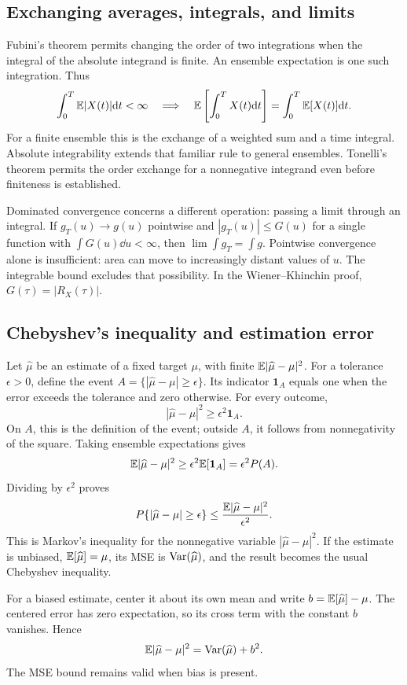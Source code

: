 \subsection{Exchanging averages, integrals, and limits}
\label{app:integration}
Fubini's theorem permits changing the order of two integrations when the integral of the absolute integrand is finite. An ensemble expectation is one such integration. Thus
\[
\int_0^T\mathbb E|X(t)|\mathrm d t<\infty
\quad\Longrightarrow\quad
\mathbb E\left[\int_0^T X(t)\mathrm d t\right]
=\int_0^T\mathbb E[X(t)]\mathrm d t.
\]
For a finite ensemble this is the exchange of a weighted sum and a time integral. Absolute integrability extends that familiar rule to general ensembles. Tonelli's theorem permits the order exchange for a nonnegative integrand even before finiteness is established.

Dominated convergence concerns a different operation: passing a limit through an integral. If $g_T(u)\to g(u)$ pointwise and $|g_T(u)|\leq G(u)$ for a single function with $\int G(u)\dd u<\infty$, then $\lim\int g_T=\int g$. Pointwise convergence alone is insufficient: area can move to increasingly distant values of $u$. The integrable bound excludes that possibility. In the Wiener--Khinchin proof, $G(\tau)=|R_X(\tau)|$.

\subsection{Chebyshev's inequality and estimation error}
\label{app:chebyshev}
Let $\widehat\mu$ be an estimate of a fixed target $\mu$, with finite $\mathbb E|\widehat\mu-\mu|^2$. For a tolerance $\epsilon>0$, define the event
$A=\{|\widehat\mu-\mu|\geq\epsilon\}$. Its indicator $\mathbf1_A$ equals one when the error exceeds the tolerance and zero otherwise. For every outcome,
\[
|\widehat\mu-\mu|^2\geq\epsilon^2\mathbf1_A.
\]
On $A$, this is the definition of the event; outside $A$, it follows from nonnegativity of the square. Taking ensemble expectations gives
\[
\mathbb E|\widehat\mu-\mu|^2\geq\epsilon^2\mathbb E[\mathbf1_A]
=\epsilon^2P(A).
\]
Dividing by $\epsilon^2$ proves
\[
P\{|\widehat\mu-\mu|\geq\epsilon\}
\leq\frac{\mathbb E|\widehat\mu-\mu|^2}{\epsilon^2}.
\]
This is Markov's inequality for the nonnegative variable $|\widehat\mu-\mu|^2$. If the estimate is unbiased, $\mathbb E[\widehat\mu]=\mu$, its MSE is $\operatorname{Var}(\widehat\mu)$, and the result becomes the usual Chebyshev inequality.

For a biased estimate, center it about its own mean and write $b=\mathbb E[\widehat\mu]-\mu$. The centered error has zero expectation, so its cross term with the constant $b$ vanishes. Hence
\[
\mathbb E|\widehat\mu-\mu|^2=\operatorname{Var}(\widehat\mu)+b^2.
\]
The MSE bound remains valid when bias is present.

